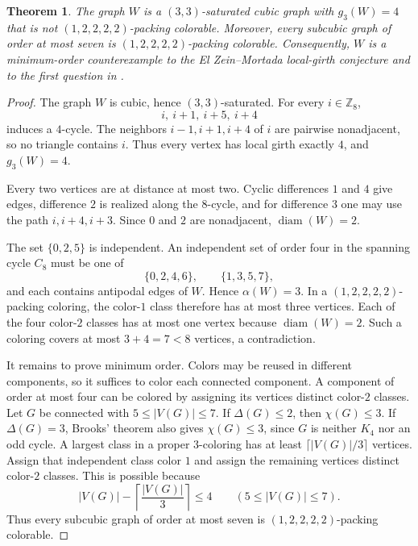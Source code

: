 \documentclass[11pt]{amsart}
\newtheorem{theorem}{Theorem}
\newcommand{\Z}{\mathbb Z}
\begin{document}
\begin{theorem}\label{thm:main}
The graph $W$ is a $(3,3)$-saturated cubic graph with $g_3(W)=4$ that is
not $(1,2,2,2,2)$-packing colorable. Moreover, every subcubic graph of
order at most seven is $(1,2,2,2,2)$-packing colorable. Consequently,
$W$ is a minimum-order counterexample to the El Zein--Mortada local-girth
conjecture and to the first question in
\cite[Problem~1]{ElZeinMortadaStep}.
\end{theorem}

\begin{proof}
The graph $W$ is cubic, hence $(3,3)$-saturated. For every $i\in\Z_8$,
\[
  i,\ i+1,\ i+5,\ i+4
\]
induces a $4$-cycle. The neighbors $i-1,i+1,i+4$ of $i$ are pairwise
nonadjacent, so no triangle contains $i$. Thus every vertex has local
girth exactly $4$, and $g_3(W)=4$.

Every two vertices are at distance at most two. Cyclic differences
$1$ and $4$ give edges, difference $2$ is realized along the $8$-cycle,
and for difference $3$ one may use the path
$i,i+4,i+3$. Since $0$ and $2$ are nonadjacent,
$\operatorname{diam}(W)=2$.

The set $\{0,2,5\}$ is independent. An independent set of order four
in the spanning cycle $C_8$ must be one of
\[
  \{0,2,4,6\},\qquad \{1,3,5,7\},
\]
and each contains antipodal edges of $W$. Hence $\alpha(W)=3$.
In a $(1,2,2,2,2)$-packing coloring, the color-$1$ class therefore has
at most three vertices. Each of the four color-$2$ classes has at most
one vertex because $\operatorname{diam}(W)=2$. Such a coloring covers
at most $3+4=7<8$ vertices, a contradiction.

It remains to prove minimum order. Colors may be reused in different
components, so it suffices to color each connected component. A
component of order at most four can be colored by assigning its vertices
distinct color-$2$ classes. Let $G$ be connected with
$5\le |V(G)|\le7$. If $\Delta(G)\le2$, then $\chi(G)\le3$. If
$\Delta(G)=3$, Brooks' theorem also gives $\chi(G)\le3$, since $G$ is
neither $K_4$ nor an odd cycle. A largest class in a proper
$3$-coloring has at least $\lceil |V(G)|/3\rceil$ vertices. Assign that
independent class color $1$ and assign the remaining vertices distinct
color-$2$ classes. This is possible because
\[
  |V(G)|-\left\lceil\frac{|V(G)|}{3}\right\rceil\le4
  \qquad (5\le |V(G)|\le7).
\]
Thus every subcubic graph of order at most seven is
$(1,2,2,2,2)$-packing colorable.
\end{proof}
\end{document}
